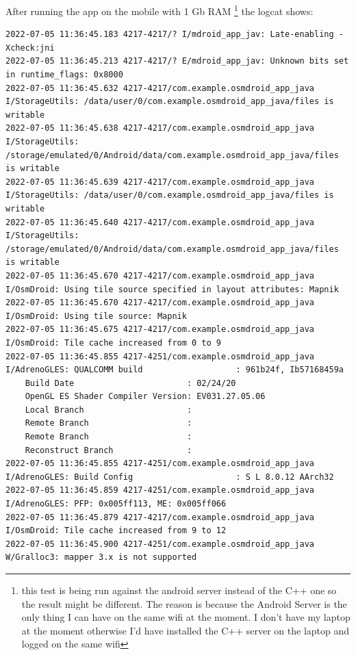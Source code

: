 \documentclass[a4paper,12pt]{book}
\begin{document}
After running the app on the mobile with 1 Gb RAM \footnote{\label{mobile-crash} this test is being run against the android server instead of the C++ one so the result might be different. The reason is because the Android Server is the only thing I can have on the same wifi at the moment. I don't have my laptop at the moment otherwise I'd have installed the C++ server on the laptop and logged on the same wifi} the logcat shows:

\begin{lstlisting}
2022-07-05 11:36:45.183 4217-4217/? I/mdroid_app_jav: Late-enabling -Xcheck:jni
2022-07-05 11:36:45.213 4217-4217/? E/mdroid_app_jav: Unknown bits set in runtime_flags: 0x8000
2022-07-05 11:36:45.632 4217-4217/com.example.osmdroid_app_java I/StorageUtils: /data/user/0/com.example.osmdroid_app_java/files is writable
2022-07-05 11:36:45.638 4217-4217/com.example.osmdroid_app_java I/StorageUtils: /storage/emulated/0/Android/data/com.example.osmdroid_app_java/files is writable
2022-07-05 11:36:45.639 4217-4217/com.example.osmdroid_app_java I/StorageUtils: /data/user/0/com.example.osmdroid_app_java/files is writable
2022-07-05 11:36:45.640 4217-4217/com.example.osmdroid_app_java I/StorageUtils: /storage/emulated/0/Android/data/com.example.osmdroid_app_java/files is writable
2022-07-05 11:36:45.670 4217-4217/com.example.osmdroid_app_java I/OsmDroid: Using tile source specified in layout attributes: Mapnik
2022-07-05 11:36:45.670 4217-4217/com.example.osmdroid_app_java I/OsmDroid: Using tile source: Mapnik
2022-07-05 11:36:45.675 4217-4217/com.example.osmdroid_app_java I/OsmDroid: Tile cache increased from 0 to 9
2022-07-05 11:36:45.855 4217-4251/com.example.osmdroid_app_java I/AdrenoGLES: QUALCOMM build                   : 961b24f, Ib57168459a
    Build Date                       : 02/24/20
    OpenGL ES Shader Compiler Version: EV031.27.05.06
    Local Branch                     : 
    Remote Branch                    : 
    Remote Branch                    : 
    Reconstruct Branch               : 
2022-07-05 11:36:45.855 4217-4251/com.example.osmdroid_app_java I/AdrenoGLES: Build Config                     : S L 8.0.12 AArch32
2022-07-05 11:36:45.859 4217-4251/com.example.osmdroid_app_java I/AdrenoGLES: PFP: 0x005ff113, ME: 0x005ff066
2022-07-05 11:36:45.879 4217-4217/com.example.osmdroid_app_java I/OsmDroid: Tile cache increased from 9 to 12
2022-07-05 11:36:45.900 4217-4251/com.example.osmdroid_app_java W/Gralloc3: mapper 3.x is not supported
\end{lstlisting}
\end{document}
